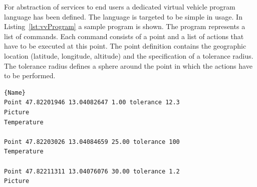 For abstraction of services to end users a dedicated virtual vehicle program language has been defined. The language is targeted to be simple in usage. In Listing~\ref{lst:vvProgram} a sample program is shown. The program represents a list of commands. Each command consists of a point and a list of actions that have to be executed at this point. The point definition contains the geographic location (latitude, longitude, altitude) and the specification of a tolerance radius. The tolerance radius defines a sphere around the point in which the actions have to be performed.

\begin{lstlisting}[caption={Virtual Vehicle Sample Program},mathescape=true,label=lst:vvProgram]{Name}
Point 47.82201946 13.04082647 1.00 tolerance 12.3
Picture
Temperature

Point 47.82203026 13.04084659 25.00 tolerance 100
Temperature

Point 47.82211311 13.04076076 30.00 tolerance 1.2
Picture
\end{lstlisting}


